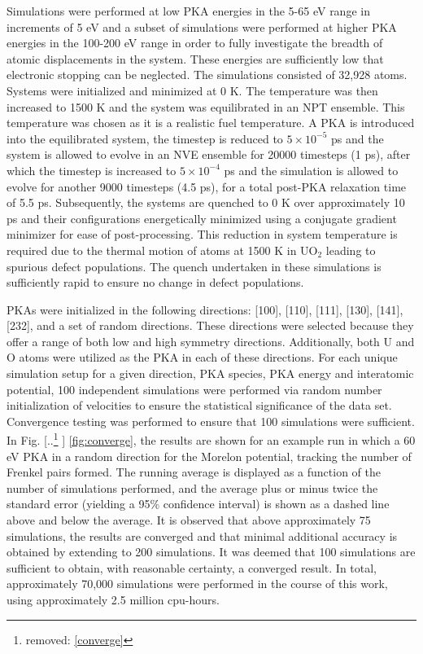 \documentclass[review]{elsarticle}
\providecommand{\DIFaddtex}[1]{{\protect\color{blue} \sf #1}} %
\providecommand{\DIFdeltex}[1]{{\protect\color{red} [..\footnote{removed: #1} ]}} %
\providecommand{\DIFaddbegin}{} %
\providecommand{\DIFaddend}{} %
\providecommand{\DIFdelbegin}{} %
\providecommand{\DIFdelend}{} %
\providecommand{\DIFadd}[1]{\texorpdfstring{\DIFaddtex{#1}}{#1}} %
\providecommand{\DIFdel}[1]{\texorpdfstring{\DIFdeltex{#1}}{}} %
\newcommand{\DIFscaledelfig}{0.5}
\newlength{\DIFdelgraphicswidth} %
\newlength{\DIFdelgraphicsheight} %
\newcommand{\DIFaddincludegraphics}[2][]{{\color{blue}\fbox{\DIFOincludegraphics[#1]{#2}}}} %
\newcommand{\DIFdelincludegraphics}[2][]{%
\sbox{\DIFdelgraphicsbox}{\DIFOincludegraphics[#1]{#2}}%
\settoboxwidth{\DIFdelgraphicswidth}{\DIFdelgraphicsbox} %
\settoboxtotalheight{\DIFdelgraphicsheight}{\DIFdelgraphicsbox} %
\scalebox{\DIFscaledelfig}{%
\parbox[b]{\DIFdelgraphicswidth}{\usebox{\DIFdelgraphicsbox}\\[-\baselineskip] \rule{\DIFdelgraphicswidth}{0em}}\llap{\resizebox{\DIFdelgraphicswidth}{\DIFdelgraphicsheight}{%
\setlength{\unitlength}{\DIFdelgraphicswidth}%
\begin{picture}(1,1)%
\thicklines\linethickness{2pt} %
{\color[rgb]{1,0,0}\put(0,0){\framebox(1,1){}}}%
{\color[rgb]{1,0,0}\put(0,0){\line( 1,1){1}}}%
{\color[rgb]{1,0,0}\put(0,1){\line(1,-1){1}}}%
\end{picture}%
}\hspace*{3pt}}} %
} %
\DeclareRobustCommand{\DIFaddbegin}{\DIFOaddbegin \let\includegraphics\DIFaddincludegraphics} %
\DeclareRobustCommand{\DIFaddend}{\DIFOaddend \let\includegraphics\DIFOincludegraphics} %
\DeclareRobustCommand{\DIFdelbegin}{\DIFOdelbegin \let\includegraphics\DIFdelincludegraphics} %
\DeclareRobustCommand{\DIFdelend}{\DIFOaddend \let\includegraphics\DIFOincludegraphics} %
\begin{document}
Simulations were performed at low PKA energies in the 5-65 eV range in increments of 5 eV and a subset of simulations were performed at higher PKA energies in the 100-200 eV range in order to fully investigate the breadth of atomic displacements in the system. These energies are sufficiently low that electronic stopping can be neglected. The simulations consisted of 32,928 atoms. Systems were initialized and minimized at 0 K. The temperature was then increased to 1500 K and the system was equilibrated in an NPT ensemble. This temperature was chosen as it is a realistic fuel temperature. A PKA is introduced into the equilibrated system, the timestep is reduced to $5\times10^{-5}$ ps and the system is allowed to evolve in an NVE ensemble for 20000 timesteps (1 ps), after which the timestep is increased to $5\times10^{-4}$ ps and the simulation is allowed to evolve for another 9000 timesteps (4.5 ps), for a total post-PKA relaxation time of 5.5 ps. Subsequently, the systems are quenched to 0 K over approximately 10 ps and their configurations energetically minimized using a conjugate gradient minimizer for ease of post-processing. This reduction in system temperature is required due to the thermal motion of atoms at 1500 K in UO$_2$ leading to spurious defect populations. The quench undertaken in these simulations is sufficiently rapid to ensure no change in defect populations.

PKAs were initialized in the following directions: [100], [110], [111], [130], [141], [232], and a set of random directions. These directions were selected because they offer a range of both low and high symmetry directions. Additionally, both U and O atoms were utilized as the PKA in each of these directions. For each unique simulation setup for a given direction, PKA species, PKA energy and interatomic potential, 100 independent simulations were performed via random number initialization of velocities to ensure the statistical significance of the data set. Convergence testing was performed to ensure that 100 simulations were sufficient. In Fig. \DIFdelbegin \DIFdel{\ref{converge}}\DIFdelend \DIFaddbegin \DIFadd{\ref{fig:converge}}\DIFaddend , the results are shown for an example run in which a 60 eV PKA in a random direction for the Morelon potential, tracking the number of Frenkel pairs formed. The running average is displayed as a function of the number of simulations performed, and the average plus or minus twice the standard error (yielding a 95\% confidence interval) is shown as a dashed line above and below the average. It is observed that above approximately 75 simulations, the results are converged and that minimal additional accuracy is obtained by extending to 200 simulations. It was deemed that 100 simulations are sufficient to obtain, with reasonable certainty, a converged result. In total, approximately 70,000 simulations were performed in the course of this work, using approximately 2.5 million cpu-hours.
\end{document}
